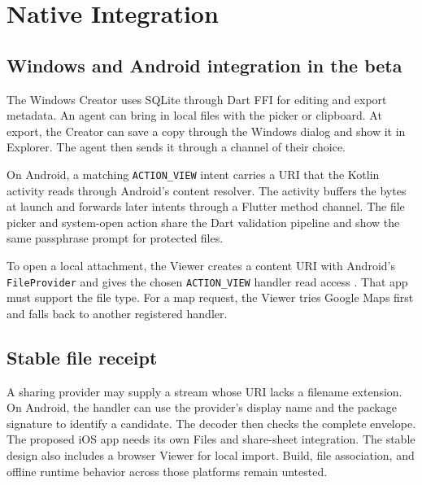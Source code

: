 \section{Native Integration}
\label{sec:native}

\subsection{Windows and Android integration in the beta}
The Windows Creator uses SQLite through Dart FFI for editing and export metadata. An agent can bring in local files with the picker or clipboard. At export, the Creator can save a copy through the Windows dialog and show it in Explorer. The agent then sends it through a channel of their choice.

On Android, a matching \texttt{ACTION\_VIEW} intent carries a URI that the Kotlin activity reads through Android's content resolver. The activity buffers the bytes at launch and forwards later intents through a Flutter method channel. The file picker and system-open action share the Dart validation pipeline and show the same passphrase prompt for protected files.

To open a local attachment, the Viewer creates a content URI with Android's \texttt{FileProvider} and gives the chosen \texttt{ACTION\_VIEW} handler read access \cite{provider}. That app must support the file type. For a map request, the Viewer tries Google Maps first and falls back to another registered handler.

\subsection{Stable file receipt}
A sharing provider may supply a stream whose URI lacks a filename extension. On Android, the handler can use the provider's display name and the package signature to identify a candidate. The decoder then checks the complete envelope. The proposed iOS app needs its own Files and share-sheet integration. The stable design also includes a browser Viewer for local import. Build, file association, and offline runtime behavior across those platforms remain untested.
